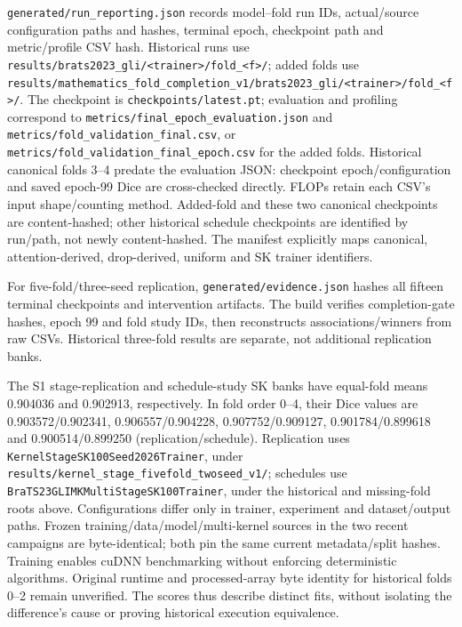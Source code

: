 \documentclass[mathematics,article,submit,pdftex,moreauthors]{Definitions/mdpi}
\begin{document}
\nolinkurl{generated/run_reporting.json} records model--fold run IDs,
actual/source configuration paths and hashes, terminal epoch, checkpoint path
and metric/profile CSV hash. Historical runs use
\nolinkurl{results/brats2023_gli/<trainer>/fold_<f>/}; added folds use
\nolinkurl{results/mathematics_fold_completion_v1/brats2023_gli/<trainer>/fold_<f>/}.
The checkpoint is
\nolinkurl{checkpoints/latest.pt}; evaluation and profiling correspond to
\nolinkurl{metrics/final_epoch_evaluation.json} and
\nolinkurl{metrics/fold_validation_final.csv}, or
\nolinkurl{metrics/fold_validation_final_epoch.csv} for the added folds.
Historical canonical folds 3--4 predate the evaluation JSON: checkpoint
epoch/configuration and saved epoch-99 Dice are cross-checked directly.
FLOPs retain each CSV's input shape/counting method. Added-fold and these two
canonical checkpoints are content-hashed; other historical schedule
checkpoints are identified by run/path, not newly content-hashed.
The manifest explicitly maps canonical, attention-derived, drop-derived,
uniform and SK trainer identifiers.

For five-fold/three-seed replication, \nolinkurl{generated/evidence.json}
hashes all fifteen terminal checkpoints and intervention artifacts.
The build verifies completion-gate hashes, epoch 99 and fold study IDs,
then reconstructs associations/winners from raw CSVs. Historical three-fold
results are separate, not additional replication banks.

The S1 stage-replication and schedule-study SK banks have equal-fold means
0.904036 and 0.902913, respectively. In fold order 0--4, their Dice values
are 0.903572/0.902341, 0.906557/0.904228, 0.907752/0.909127,
0.901784/0.899618 and 0.900514/0.899250 (replication/schedule).
Replication uses
\nolinkurl{KernelStageSK100Seed2026Trainer}, under
\nolinkurl{results/kernel_stage_fivefold_twoseed_v1/}; schedules use
\nolinkurl{BraTS23GLIMKMultiStageSK100Trainer}, under the historical and
missing-fold roots above. Configurations differ only in trainer, experiment
and dataset/output paths. Frozen training/data/model/multi-kernel sources in
the two recent campaigns are byte-identical; both pin the same current
metadata/split hashes. Training enables cuDNN benchmarking without enforcing
deterministic algorithms. Original runtime and processed-array byte identity
for historical folds 0--2 remain unverified. The scores thus describe distinct
fits, without isolating the difference's cause or proving historical execution
equivalence.
\end{document}
